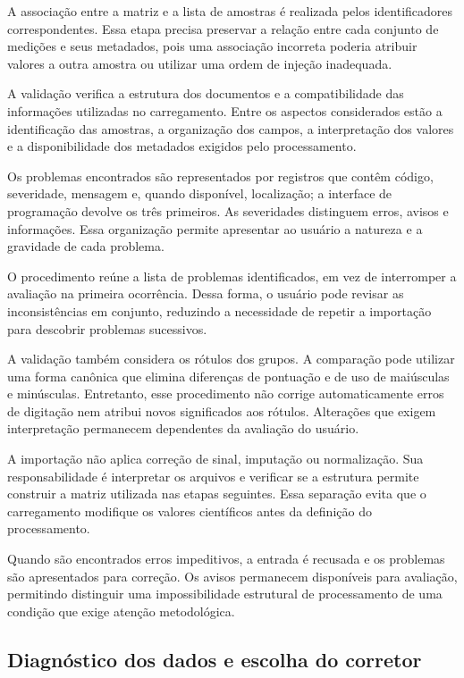 A associação entre a matriz e a lista de amostras é realizada pelos identificadores correspondentes. Essa etapa precisa preservar a relação entre cada conjunto de medições e seus metadados, pois uma associação incorreta poderia atribuir valores a outra amostra ou utilizar uma ordem de injeção inadequada.

A validação verifica a estrutura dos documentos e a compatibilidade das informações utilizadas no carregamento. Entre os aspectos considerados estão a identificação das amostras, a organização dos campos, a interpretação dos valores e a disponibilidade dos metadados exigidos pelo processamento.

Os problemas encontrados são representados por registros que contêm código, severidade, mensagem e, quando disponível, localização; a interface de programação devolve os três primeiros. As severidades distinguem erros, avisos e informações. Essa organização permite apresentar ao usuário a natureza e a gravidade de cada problema.

O procedimento reúne a lista de problemas identificados, em vez de interromper a avaliação na primeira ocorrência. Dessa forma, o usuário pode revisar as inconsistências em conjunto, reduzindo a necessidade de repetir a importação para descobrir problemas sucessivos.

A validação também considera os rótulos dos grupos. A comparação pode utilizar uma forma canônica que elimina diferenças de pontuação e de uso de maiúsculas e minúsculas. Entretanto, esse procedimento não corrige automaticamente erros de digitação nem atribui novos significados aos rótulos. Alterações que exigem interpretação permanecem dependentes da avaliação do usuário.

A importação não aplica correção de sinal, imputação ou normalização. Sua responsabilidade é interpretar os arquivos e verificar se a estrutura permite construir a matriz utilizada nas etapas seguintes. Essa separação evita que o carregamento modifique os valores científicos antes da definição do processamento.

Quando são encontrados erros impeditivos, a entrada é recusada e os problemas são apresentados para correção. Os avisos permanecem disponíveis para avaliação, permitindo distinguir uma impossibilidade estrutural de processamento de uma condição que exige atenção metodológica.

\subsection{Diagnóstico dos dados e escolha do corretor}
\label{subsec:diagnostico-escolha-corretor}

